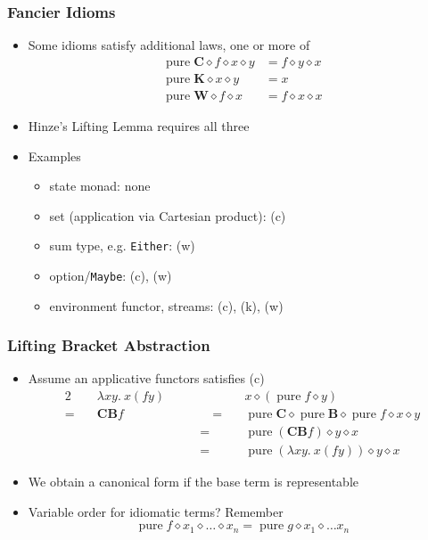 \documentclass[smaller,leqno]{beamer}
\DeclareMathOperator{\pure}{pure}
\newcommand{\ap}{\diamond}
\begin{document}
\begin{frame}
\frametitle{Fancier Idioms}

\begin{itemize}
\item Some idioms satisfy additional laws, one or more of
\begin{align*}
\pure \mathbf{C} \ap f \ap x \ap y &= f \ap y \ap x \tag{c}\\
\pure \mathbf{K} \ap x \ap y &= x \tag{k}\\
\pure \mathbf{W} \ap f \ap x &= f \ap x \ap x \tag{w}
\end{align*}
\item Hinze's Lifting Lemma requires all three
\item Examples
\begin{itemize}
\item state monad: none
\item set (application via Cartesian product): (c)
\item sum type, e.g. \lstinline|Either|: (w)
\item option/\lstinline|Maybe|: (c), (w)
\item environment functor, streams: (c), (k), (w)
\end{itemize}
\end{itemize}
\end{frame}

\begin{frame}
\frametitle{Lifting Bracket Abstraction}

\begin{itemize}
\item Assume an applicative functors satisfies (c)
\begin{alignat*}{2}
\quad& \lambda x y.\> x (f y) & \quad& x \ap (\pure f \ap y) \\
=\quad& \mathbf{C B} f & \quad\qquad=\quad& \pure \mathbf{C} \ap \pure \mathbf{B} \ap \pure f \ap x \ap y \\
& & \qquad=\quad& \pure{(\mathbf{C B} f)} \ap y \ap x \\
& & \qquad=\quad& \pure{(\lambda x y.\> x (f y))} \ap y \ap x
\end{alignat*}

\item We obtain a canonical form if the base term is representable
\pause\item Variable order for idiomatic terms? Remember
\[ \pure f \ap x_1 \ap \dots \ap x_n = \pure g \ap x_1 \ap \dots x_n \]
\end{itemize}
\end{frame}
\end{document}

